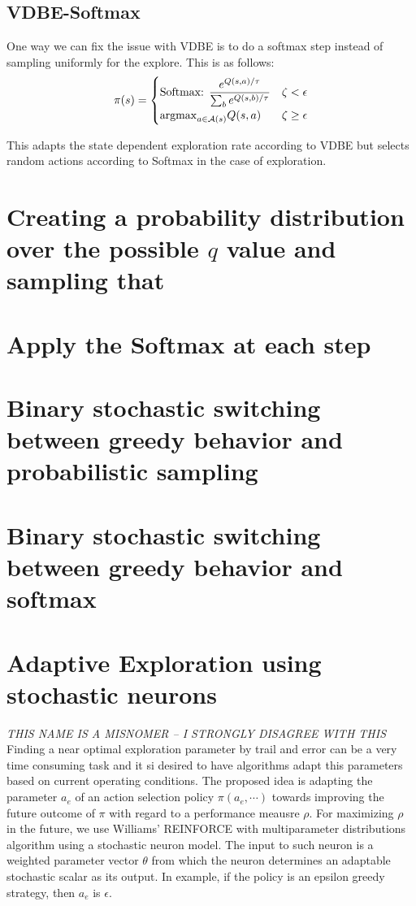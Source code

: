 \documentclass[10.5pt]{article}
\begin{document}
\subsection{VDBE-Softmax}
One way we can fix the issue with VDBE is to do a softmax step instead of sampling uniformly for the explore. This is as follows: 
\begin{equation}
\pi(s) = \begin{cases}
\text{Softmax: }\dfrac{e^{Q(s,a)/\tau}}{\sum_be^{Q(s,b)/\tau}} & \zeta < \epsilon \\
{\rm argmax}_{a\in {\cal A}(s)}Q(s,a) & \zeta \geq \epsilon
\end{cases}
\end{equation}

This adapts the state dependent exploration rate according to VDBE but selects random actions according to Softmax in the case of exploration. 

\section{Creating a probability distribution over the possible $q$ value and sampling that}

\section{Apply the Softmax at each step}

\section{Binary stochastic switching between greedy behavior and probabilistic sampling}

\section{Binary stochastic switching between greedy behavior and softmax}

\section{Adaptive Exploration using stochastic neurons}
\emph{THIS NAME IS A MISNOMER -- I STRONGLY DISAGREE WITH THIS}\\

Finding a near optimal exploration parameter by trail and error can be a very time consuming task and it si desired to have algorithms adapt this parameters based on current operating conditions. The proposed idea is adapting the parameter $a_e$ of an action selection policy $\pi(a_e,\cdots)$ towards improving the future outcome of $\pi$ with regard to a performance meausre $\rho$. For maximizing $\rho$ in the future, we use Williams' REINFORCE with multiparameter distributions algorithm using a stochastic neuron model. The input to such neuron is a weighted parameter vector $\theta$ from which the neuron determines an adaptable stochastic scalar as its output. In example, if the policy is an epsilon greedy strategy, then $a_e$ is $\epsilon$. \\
\end{document}
